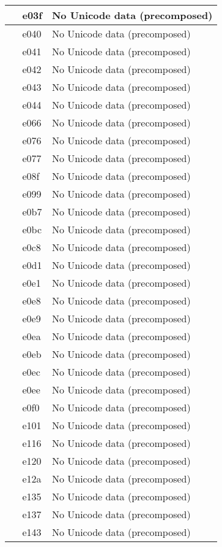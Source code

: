 \documentclass[12pt,letterpaper,openany]{book}
\begin{document}
\begin{center}
\begin{supertabular}{|m{0.25in}|m{0.5in}|m{4in}|}
 & e03f & No Unicode data (precomposed)\\\hline
 & e040 & No Unicode data (precomposed)\\\hline
 & e041 & No Unicode data (precomposed)\\\hline
 & e042 & No Unicode data (precomposed)\\\hline
 & e043 & No Unicode data (precomposed)\\\hline
 & e044 & No Unicode data (precomposed)\\\hline
 & e066 & No Unicode data (precomposed)\\\hline
 & e076 & No Unicode data (precomposed)\\\hline
 & e077 & No Unicode data (precomposed)\\\hline
 & e08f & No Unicode data (precomposed)\\\hline
 & e099 & No Unicode data (precomposed)\\\hline
 & e0b7 & No Unicode data (precomposed)\\\hline
 & e0bc & No Unicode data (precomposed)\\\hline
 & e0c8 & No Unicode data (precomposed)\\\hline
 & e0d1 & No Unicode data (precomposed)\\\hline
 & e0e1 & No Unicode data (precomposed)\\\hline
 & e0e8 & No Unicode data (precomposed)\\\hline
 & e0e9 & No Unicode data (precomposed)\\\hline
 & e0ea & No Unicode data (precomposed)\\\hline
 & e0eb & No Unicode data (precomposed)\\\hline
 & e0ec & No Unicode data (precomposed)\\\hline
 & e0ee & No Unicode data (precomposed)\\\hline
 & e0f0 & No Unicode data (precomposed)\\\hline
 & e101 & No Unicode data (precomposed)\\\hline
 & e116 & No Unicode data (precomposed)\\\hline
 & e120 & No Unicode data (precomposed)\\\hline
 & e12a & No Unicode data (precomposed)\\\hline
 & e135 & No Unicode data (precomposed)\\\hline
 & e137 & No Unicode data (precomposed)\\\hline
 & e143 & No Unicode data (precomposed)\\\hline

\end{supertabular}
\end{center}
\end{document}
